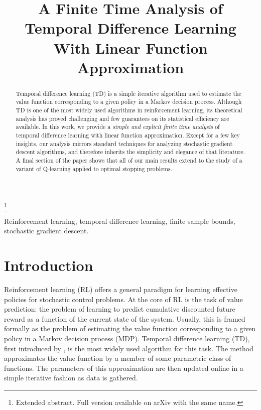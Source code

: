 \documentclass[final,12pt]{colt2018} %
\title[Finite Time Analysis of TD]{A Finite Time Analysis of Temporal Difference Learning With Linear Function Approximation}
\begin{document}
\maketitle
\footnote{Extended abstract. Full version available on arXiv with the same name.}
\begin{abstract}
Temporal difference learning (TD) is a simple iterative algorithm used to estimate the value function corresponding to a given policy in a Markov decision process. Although TD is one of the most widely used algorithms in reinforcement learning, its theoretical analysis has proved challenging and few guarantees on its statistical efficiency are available. In this work, we provide a \emph{simple and explicit finite time analysis} of temporal difference learning with linear function approximation. Except for a few key insights, our analysis mirrors standard techniques for  analyzing stochastic gradient descent algorithms, and therefore inherits the simplicity and elegance of that literature. A final section of the paper shows that all of our main results extend to the study of a variant of Q-learning applied to optimal stopping problems.
\end{abstract}

\begin{keywords}
Reinforcement learning, temporal difference learning, finite sample bounds, stochastic gradient descent. 
\end{keywords}



\section{Introduction} \label{sec:introduction}

Reinforcement learning (RL) offers a general paradigm for learning effective policies for stochastic control problems. At the core of RL is the task of value prediction: the problem of learning to predict cumulative discounted future reward as a function of the current state of the system. Usually, this is framed formally as the problem of estimating the value function corresponding to a given policy in a Markov decision process (MDP).  Temporal difference learning (TD),  first introduced by \cite{sutton1988learning}, is the most widely used algorithm for this task. The method approximates the value function by a member of some parametric class of functions. The parameters of this approximation are then updated online in a simple iterative fashion as data is gathered. 
\end{document}
